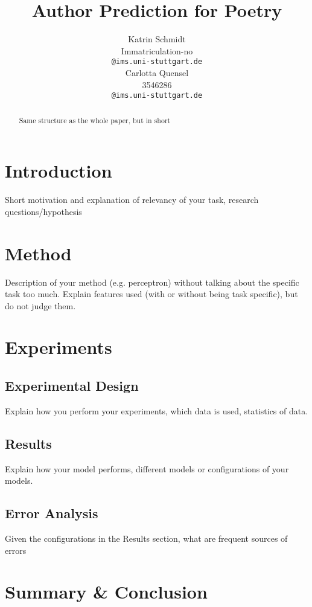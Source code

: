 \documentclass[11pt]{article}
\title{Author Prediction for Poetry}
\author{Katrin Schmidt \\
   Immatriculation-no\\
  \texttt{@ims.uni-stuttgart.de} \\\And
  Carlotta Quensel \\
  3546286 \\
  \texttt{@ims.uni-stuttgart.de} \\}
\begin{document}
\maketitle
\begin{abstract}
Same structure as the whole paper, but in short
\end{abstract}

\section{Introduction}

Short motivation and explanation of relevancy
of your task, research questions/hypothesis


\section{Method}

Description of your method (e.g. perceptron) without talking about the specific task too much. Explain features used (with or without being task specific), but do not judge them.

\section{Experiments}

\subsection{Experimental Design}

Explain how you perform your experiments, which data is used, statistics of data.

\subsection{Results}

Explain how your model performs, different models or configurations of your models.

\subsection{Error Analysis}

Given the configurations in the Results section, what are frequent sources of errors

\section{Summary \& Conclusion}
\end{document}
